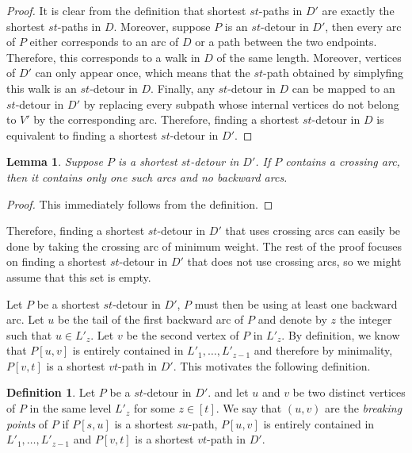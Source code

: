 \documentclass[utf8,11pt]{article}
\theoremstyle{plain}
\newtheorem{lemma}[theorem]{Lemma}
\theoremstyle{definition}
\newtheorem{definition}[theorem]{Definition}
\begin{document}
\begin{proof}
It is clear from the definition that shortest $st$-paths in $D'$ are exactly the shortest $st$-paths in $D$. Moreover, suppose $P$ is an $st$-detour in $D'$, then every arc of $P$ either corresponds to an arc of $D$ or a path between the two endpoints. Therefore, this corresponds to a walk in $D$ of the same length. Moreover, vertices of $D'$ can only appear once, which means that the $st$-path obtained by simplyfing this walk is an $st$-detour in $D$. Finally, any $st$-detour in $D$ can be mapped to an $st$-detour in $D'$ by replacing every subpath whose internal vertices do not belong to $V'$ by the corresponding arc. Therefore, finding a shortest $st$-detour in $D$ is equivalent to finding a shortest $st$-detour in $D'$. 
\end{proof}


\begin{lemma}
    Suppose $P$ is a shortest $st$-detour in $D'$. If $P$ contains a crossing arc, then it contains only one such arcs and no backward arcs.
\end{lemma}

\begin{proof}
    This immediately follows from the definition.
\end{proof}

Therefore, finding a shortest $st$-detour in $D'$ that uses crossing arcs can easily be done by taking the crossing arc of minimum weight. The rest of the proof focuses on finding a shortest $st$-detour in $D'$ that does not use crossing arcs, so we might assume that this set is empty. 

Let $P$ be a shortest $st$-detour in $D'$, $P$ must then be using at least one backward arc. Let $u$ be the tail of the first backward arc of $P$ and denote by $z$ the integer such that $u \in L'_z$. Let $v$ be the second vertex of $P$ in $L'_z$. By definition, we know that $P[u,v]$ is entirely contained in $L'_1, \dots, L'_{z-1}$ and therefore by minimality, $P[v,t]$ is a shortest $vt$-path in $D'$. This motivates the following definition.

\begin{definition}
    Let $P$ be a $st$-detour in $D'$. and let $u$ and $v$ be two distinct vertices of $P$ in the same level $L'_z$ for some $z \in [t]$. We say that $(u,v)$ are the \textit{breaking points} of $P$ if $P[s,u]$ is a shortest $su$-path, $P[u,v]$ is entirely contained in $L'_1, \dots, L'_{z-1}$ and $P[v,t]$ is a shortest $vt$-path in $D'$.
\end{definition}
\end{document}

